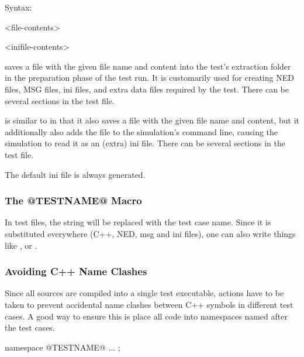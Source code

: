 Syntax:

\begin{filelisting}
<file-contents>
\end{filelisting}

\begin{filelisting}
<inifile-contents>
\end{filelisting}

 saves a file with the given file name and content into the test's
extraction folder in the preparation phase of the test run. It is customarily
used for creating NED files, MSG files, ini files, and extra data files
required by the test. There can be several  sections in the test file.

 is similar to  in that it also saves a file with the
given file name and content, but it additionally also adds the file to the simulation's
command line, causing the simulation to read it as an (extra) ini file.
There can be several  sections in the test file.

The default ini file is always generated.


\subsubsection{The @TESTNAME@ Macro}
\label{sec:testing:opptest:testname-macro}

In test files, the string  will be replaced with the test
case name. Since it is substituted everywhere (C++, NED, msg and ini
files), one can also write things like , or
.

\subsubsection{Avoiding C++ Name Clashes}
\label{sec:testing:opptest:avoiding-cpp-name-clashes}

Since all sources are compiled into a single test executable, actions have
to be taken to prevent accidental name clashes between C++ symbols in
different test cases. A good way to ensure this is place all code into
namespaces named after the test cases.

\begin{filelisting}
namespace @TESTNAME@ {
   ...
};
\end{filelisting}

